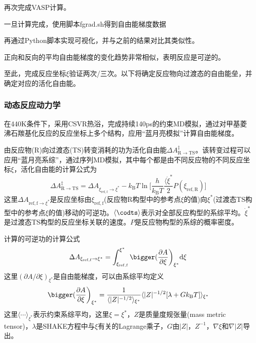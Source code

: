再次完成\textrm{VASP}计算。

一旦计算完成，使用脚本\textrm{fgrad.sh}得到自由能梯度数据

再通过\textrm{Python}脚本实现可视化，并与之前的结果对比其类似性。

正向和反向的平均自由能梯度的变化趋势非常相似，表明反应是可逆的。

至此，完成反应坐标$\xi$验证两次/三次。以下将确定反应物向过渡态的自由能垒，并确定对应的活化自由能。

\subsubsection{动态反应动力学}
在\textrm{440K}条件下，采用\textrm{CSVR}热浴，完成持续\textrm{140ps}的约束\textrm{MD}模拟，通过对甲基菱沸石羰基化反应的反应坐标上多个结构，应用``蓝月亮模拟''计算自由能梯度。

由反应物\textrm{(R)}向过渡态\textrm{(TS)}转变消耗的功为活化自由能$\Delta A_{\mathrm{R}\rightarrow\mathrm{TS}}^{\ddagger}$。该转变过程可以应用``蓝月亮系综''，通过序列\textrm{MD}模拟，其中每个都是由不同反应物的不同反应坐标$\xi$，活化自由能的计算公式为
\begin{displaymath}
	\Delta A_{\mathrm{R}\rightarrow\mathrm{TS}}^{\ddagger}=\Delta A_{\xi_{\mathrm{ref},\mathrm{f}}\rightarrow{\xi}^{\ast}}-k_{\mathrm{B}}T\ln\bigg[\dfrac{h}{k_{\mathrm{B}}T}\dfrac{\langle\dot{\xi}^{\ast}}2P(\xi_{\mathrm{ref},\mathrm{R}})\bigg]
\end{displaymath}
这里$\Delta A_{\mathrm{ref},\mathrm{f}\rightarrow{\xi}^{\ast}}$是反应坐标由$\xi_{\mathrm{ref},\mathrm{f}}$(反应物\textrm{R}构型中的参考点$\xi$的值)向$\xi^{\ast}$(过渡态\textrm{TS}构型中的参考点$\xi$的值)移动的可逆功。$\langle\codts\rangle$表示对全部反应构型的系综平均。$\dot{\xi}^{\ast}$是过渡态\textrm{TS}构型的反应坐标关联的速度。$P$是反应物构型的系综的概率密度。

计算的可逆功的计算公式
\begin{displaymath}
	\Delta A_{\xi_{\mathrm{ref},\mathrm{f}}\rightarrow{\xi}^{\ast}}=\int_{\xi_{\mathrm{ref},\mathrm{f}}}^{\xi^{\ast}}\bigger(\dfrac{\partial A}{\partial\xi}\bigg)_{\xi^{\ast}}\mathrm{d}\xi
\end{displaymath}
这里$(\partial A/\partial\xi)_{\xi^{\ast}}$是自由能梯度，可以由系综平均定义
\begin{displaymath}
	\bigger(\dfrac{\partial A}{\partial\xi}\bigg)_{\xi^{\ast}}=\dfrac1{\langle|Z|^{-1/2}\rangle_{\xi^{\ast}}}\langle|Z|^{-1/2}[\lambda+Gk_{\mathrm{B}}T]\rangle_{\xi^{\ast}}
\end{displaymath}
这里$\langle\cdots\rangle_{\xi^{\ast}}$表示约束系综平均，这里$\xi=\xi^{\ast}$，$Z$是质量度规张量\textrm{(mass metric tensor)}，$\lambda$是\textrm{SHAKE}方程中与$\xi$有关的\textrm{Lagrange}乘子，$G$由$|Z|$，$Z^{-1}$，$\nabla\xi$和$\nabla|Z|$导出。

